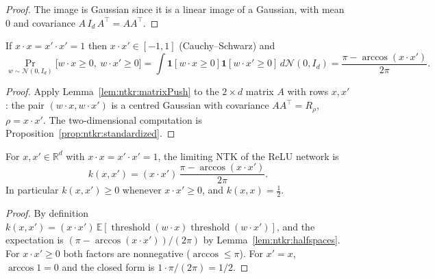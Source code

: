 \begin{proof}
  \leanok
The image is Gaussian since it is a linear image of a Gaussian, with mean $0$ and covariance
$A\,I_d\,A^\top=AA^\top$.
\end{proof}

\begin{lemma}\label{lem:ntkr:halfspaces}
  \leanok
If $x\cdot x=x'\cdot x'=1$ then $x\cdot x'\in[-1,1]$ (Cauchy--Schwarz) and
\[
  \Pr_{w\sim\mathcal N(0,I_d)}\bigl[w\cdot x\ge0,\ w\cdot x'\ge0\bigr]
  =\int\mathbf 1[w\cdot x\ge0]\mathbf 1[w\cdot x'\ge0]\,d\mathcal N(0,I_d)
  =\frac{\pi-\arccos(x\cdot x')}{2\pi}.
\]
\end{lemma}

\begin{proof}
  \leanok
Apply Lemma~\ref{lem:ntkr:matrixPush} to the $2\times d$ matrix $A$ with rows $x,x'$: the pair
$(w\cdot x,w\cdot x')$ is a centred Gaussian with covariance $AA^\top=R_\rho$, $\rho=x\cdot x'$. The two-dimensional
computation is Proposition~\ref{prop:ntkr:standardized}.
\end{proof}

\begin{theorem}\label{thm:ntkr:reluNTK}
  \leanok
For $x,x'\in\mathbb R^d$ with $x\cdot x=x'\cdot x'=1$, the limiting NTK of the ReLU network is
\[
  k(x,x')=(x\cdot x')\,\frac{\pi-\arccos(x\cdot x')}{2\pi}.
\]
In particular $k(x,x')\ge0$ whenever $x\cdot x'\ge0$, and $k(x,x)=\tfrac12$.
\end{theorem}

\begin{proof}
  \leanok
By definition $k(x,x')=(x\cdot x')\,\mathbb E[\operatorname{threshold}(w\cdot x)\operatorname{threshold}(w\cdot x')]$, and the expectation is
$(\pi-\arccos(x\cdot x'))/(2\pi)$ by Lemma~\ref{lem:ntkr:halfspaces}. For $x\cdot x'\ge0$ both factors are
nonnegative ($\arccos\le\pi$). For $x'=x$, $\arccos1=0$ and the closed form is $1\cdot\pi/(2\pi)=1/2$.
\end{proof}
